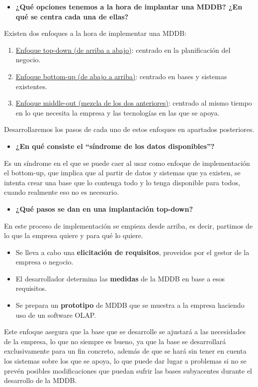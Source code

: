 \documentclass[paper=a4, fontsize=11pt]{scrartcl} %
\begin{document}
\begin{itemize}
\item \textbf{¿Qué opciones tenemos a la hora de implantar una MDDB? ¿En qué se centra cada una de ellas?}
\end{itemize}
Existen dos enfoques a la hora de implementar una MDDB:
\begin{enumerate}
\item \underline{Enfoque top-down (de arriba a abajo)}: centrado en la planificación del negocio.
\item \underline{Enfoque bottom-up (de abajo a arriba)}: centrado en bases y sistemas existentes.
\item \underline{Enfoque middle-out (mezcla de los dos anteriores)}: centrado al mismo tiempo en lo que necesita la empresa y las tecnologías en las que se apoya.
\end{enumerate}
Desarrollaremos los pasos de cada uno de estos enfoques en apartados posteriores.
\begin{itemize}
\item \textbf{ ¿En qué consiste el ``síndrome de los datos disponibles''?}
\end{itemize}
Es un síndrome en el que se puede caer al usar como enfoque de implementación el bottom-up, que implica que al partir de datos y sistemas que ya existen, se intenta crear una base que lo contenga todo y lo tenga disponible para todos, cuando realmente eso no es necesario.

\begin{itemize}
\item \textbf{ ¿Qué pasos se dan en una implantación top-down?}
\end{itemize}
En este proceso de implementación se empieza desde arriba, es decir, partimos de lo que la empresa quiere y para qué lo quiere. 
	\begin{itemize}
		\item Se lleva a cabo una \textbf{elicitación de requisitos}, proveidos por el gestor de la empresa o negocio. 
		\item El desarrollador determina las \textbf{medidas} de la MDDB en base a esos requisitos.
		\item Se prepara un \textbf{prototipo} de MDDB que se muestra a la empresa haciendo uso de un software OLAP. 
	\end{itemize}
Este enfoque asegura que la base que se desarrolle se ajustará a las necesidades de la empresa, lo que no siempre es bueno, ya que la base se desarrollará exclusivamente para un fin concreto, además de que se hará sin tener en cuenta los sistemas sobre los que se apoya, lo que puede dar lugar a problemas si no se prevén posibles modificaciones que puedan sufrir las bases subyacentes durante el desarrollo de la MDDB. 
\end{document}
